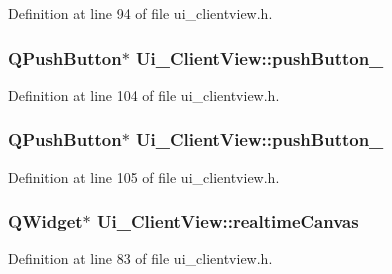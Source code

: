 Definition at line 94 of file ui\+\_\+clientview.\+h.

\hypertarget{class_ui___client_view_a7c3375ba5cb6bbc1655d590007c1e35a}{}
\subsubsection[{push\+Button\+\_\+5}]{\setlength{\rightskip}{0pt plus 5cm}Q\+Push\+Button$\ast$ Ui\+\_\+\+Client\+View\+::push\+Button\+\_}\label{class_ui___client_view_a7c3375ba5cb6bbc1655d590007c1e35a}


Definition at line 104 of file ui\+\_\+clientview.\+h.

\hypertarget{class_ui___client_view_a2371f6d8b07951b0ebc67e2ec57dac12}{}
\subsubsection[{push\+Button\+\_\+6}]{\setlength{\rightskip}{0pt plus 5cm}Q\+Push\+Button$\ast$ Ui\+\_\+\+Client\+View\+::push\+Button\+\_}\label{class_ui___client_view_a2371f6d8b07951b0ebc67e2ec57dac12}


Definition at line 105 of file ui\+\_\+clientview.\+h.

\hypertarget{class_ui___client_view_a37773ebe17a2e74feea99cb4c45be113}{}
\subsubsection[{realtime\+Canvas}]{\setlength{\rightskip}{0pt plus 5cm}Q\+Widget$\ast$ Ui\+\_\+\+Client\+View\+::realtime\+Canvas}\label{class_ui___client_view_a37773ebe17a2e74feea99cb4c45be113}


Definition at line 83 of file ui\+\_\+clientview.\+h.

\hypertarget{class_ui___client_view_a5ccc50aea2bedaeb0abfaed52336fdd4}{}
